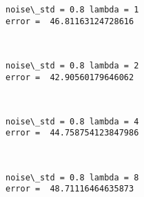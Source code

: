 \documentclass[11pt]{article}
\begin{document}
    \begin{Verbatim}[commandchars=\\\{\}]
noise\_std = 0.8 lambda = 1
error =  46.81163124728616

    \end{Verbatim}

    \begin{center}
    \end{center}
    { \hspace*{\fill} \\}
    
    \begin{Verbatim}[commandchars=\\\{\}]
noise\_std = 0.8 lambda = 2
error =  42.90560179646062

    \end{Verbatim}

    \begin{center}
    \end{center}
    { \hspace*{\fill} \\}
    
    \begin{Verbatim}[commandchars=\\\{\}]
noise\_std = 0.8 lambda = 4
error =  44.758754123847986

    \end{Verbatim}

    \begin{center}
    \end{center}
    { \hspace*{\fill} \\}
    
    \begin{Verbatim}[commandchars=\\\{\}]
noise\_std = 0.8 lambda = 8
error =  48.71116464635873

    \end{Verbatim}

    \begin{center}
    \end{center}
    { \hspace*{\fill} \\}
    
\end{document}
